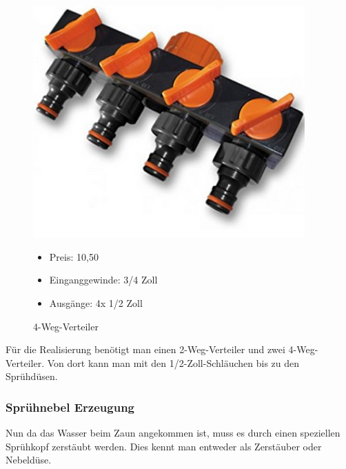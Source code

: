\begin{figure}[!ht]
\begin{minipage}[t]{0.45\textwidth}
\includegraphics[width=0.93\textwidth]{Gardena4Weg}
\caption{4-Weg-Verteiler}

\begin{itemize}
	\item{Preis: 10,50\textsf{\texteuro}}
	\item{Einganggewinde: 3/4 Zoll}
	\item{Ausgänge: 4x 1/2 Zoll}
\end{itemize}
\end{minipage}
\end{figure}

Für die Realisierung benötigt man einen 2-Weg-Verteiler und zwei 4-Weg-Verteiler. Von dort kann man mit den 1/2-Zoll-Schläuchen bis zu den Sprühdüsen.

\newpage

\subsubsection{Sprühnebel Erzeugung}
\label{sec:spruehnebel}


Nun da das Wasser beim Zaun angekommen ist, muss es durch einen speziellen Sprühkopf zerstäubt werden. Dies kennt man entweder als Zerstäuber oder Nebeldüse. 

